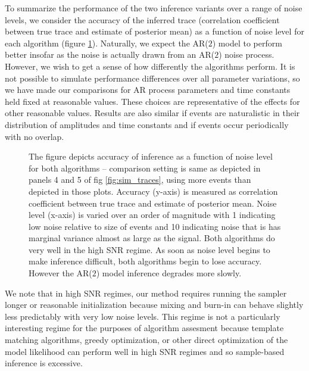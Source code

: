 \documentclass{article}
\begin{document}
To summarize the performance of the two inference variants over a range of noise levels, we consider the accuracy of the inferred trace (correlation coefficient between true trace and estimate of posterior mean) as a function of noise level for each algorithm (figure \ref{fig:sim_summary}).  Naturally, we expect the AR($2$) model to perform better insofar as the noise is actually drawn from an AR($2$) noise process.  However, we wish to get a sense of how differently the algorithms perform.  It is not possible to simulate performance differences over all parameter variations, so we have made our comparisons for AR process parameters and time constants held fixed at reasonable values.  These choices are representative of the effects for other reasonable values.  Results are also similar if events are naturalistic in their distribution of amplitudes and time constants and if events occur periodically with no overlap.

\begin{figure}[H]
\begin{center}
  \end{center}    
  \captionsetup{width=.7\textwidth}
\caption{The figure depicts accuracy of inference as a function of noise level for both algorithms -- comparison setting is same as depicted in panels 4 and 5 of fig \ref{fig:sim_traces}, using more events than depicted in those plots.  Accuracy (y-axis) is measured as correlation coefficient between true trace and estimate of posterior mean.  Noise level (x-axis) is varied over an order of magnitude with 1 indicating low noise relative to size of events and 10 indicating noise that is has marginal variance almost as large as the signal.  Both algorithms do very well in the high SNR regime.  As soon as noise level begins to make inference difficult, both algorithms begin to lose accuracy.  However the AR($2$) model inference degrades more slowly. }
\label{fig:sim_summary}
\end{figure}
  
We note that in high SNR regimes, our method requires running the sampler longer or reasonable initialization because mixing and burn-in can behave slightly less predictably with very low noise levels.  This regime is not a particularly interesting regime for the purposes of algorithm assesment because template matching algorithms, greedy optimization, or other direct optimization of the model likelihood can perform well in high SNR regimes and so sample-based inference is excessive.    
\end{document}
